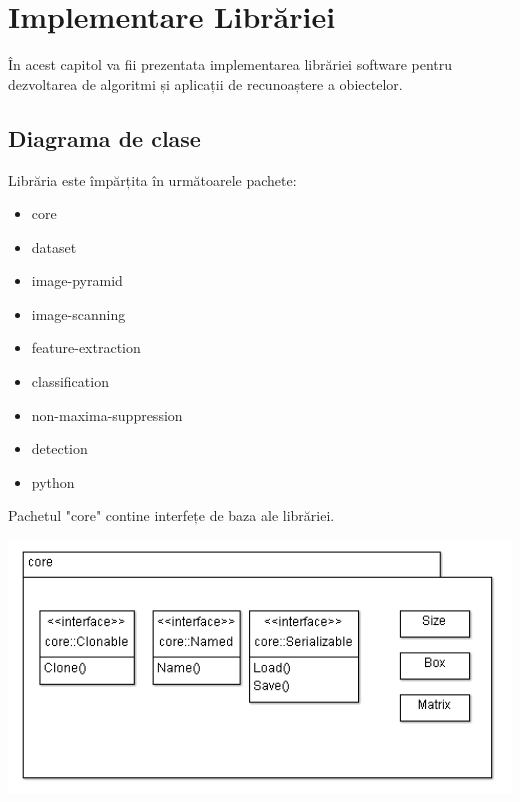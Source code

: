 \chapter{Implementare Librăriei}

În acest capitol va fii prezentata implementarea librăriei software pentru dezvoltarea de algoritmi și aplicații de recunoaștere a obiectelor.

\section{Diagrama de clase}

Librăria este împărțita în următoarele pachete:
\begin{itemize}
	\item core
	\item dataset
	\item image-pyramid
	\item image-scanning
	\item feature-extraction
	\item classification
	\item non-maxima-suppression
	\item detection
	\item python
\end{itemize}


Pachetul "core" contine interfețe de baza ale librăriei.
\begin{center}
	\includegraphics[width=1.00\textwidth]{uml/core_diagram.png}
\end{center}

